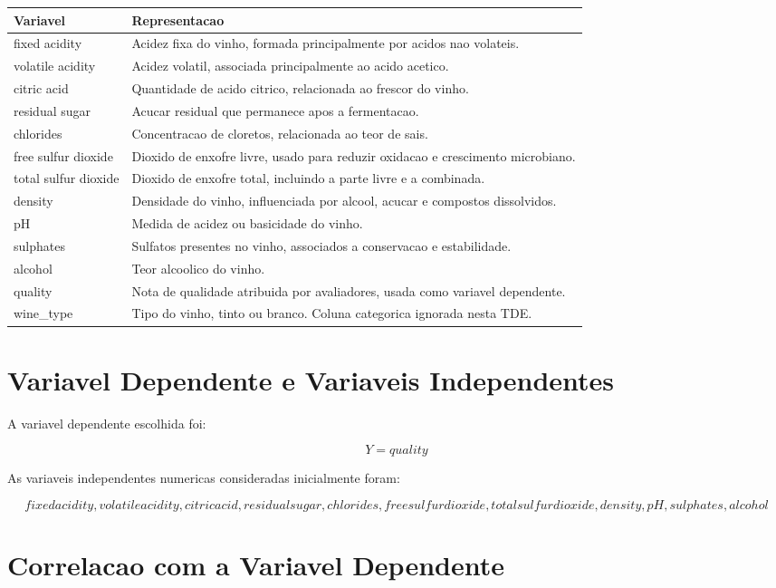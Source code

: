 \documentclass[12pt,a4paper]{article}
\begin{document}
\begin{longtable}{p{4cm}p{10cm}}
\toprule
\textbf{Variavel} & \textbf{Representacao} \\
\midrule
fixed acidity & Acidez fixa do vinho, formada principalmente por acidos nao volateis. \\
volatile acidity & Acidez volatil, associada principalmente ao acido acetico. \\
citric acid & Quantidade de acido citrico, relacionada ao frescor do vinho. \\
residual sugar & Acucar residual que permanece apos a fermentacao. \\
chlorides & Concentracao de cloretos, relacionada ao teor de sais. \\
free sulfur dioxide & Dioxido de enxofre livre, usado para reduzir oxidacao e crescimento microbiano. \\
total sulfur dioxide & Dioxido de enxofre total, incluindo a parte livre e a combinada. \\
density & Densidade do vinho, influenciada por alcool, acucar e compostos dissolvidos. \\
pH & Medida de acidez ou basicidade do vinho. \\
sulphates & Sulfatos presentes no vinho, associados a conservacao e estabilidade. \\
alcohol & Teor alcoolico do vinho. \\
quality & Nota de qualidade atribuida por avaliadores, usada como variavel dependente. \\
wine_type & Tipo do vinho, tinto ou branco. Coluna categorica ignorada nesta TDE. \\
\bottomrule
\end{longtable}

\section{Variavel Dependente e Variaveis Independentes}

A variavel dependente escolhida foi:

\[
Y = quality
\]

As variaveis independentes numericas consideradas inicialmente foram:

\[
fixed acidity, volatile acidity, citric acid, residual sugar, chlorides, free sulfur dioxide, total sulfur dioxide, density, pH, sulphates, alcohol
\]

\section{Correlacao com a Variavel Dependente}
\end{document}
